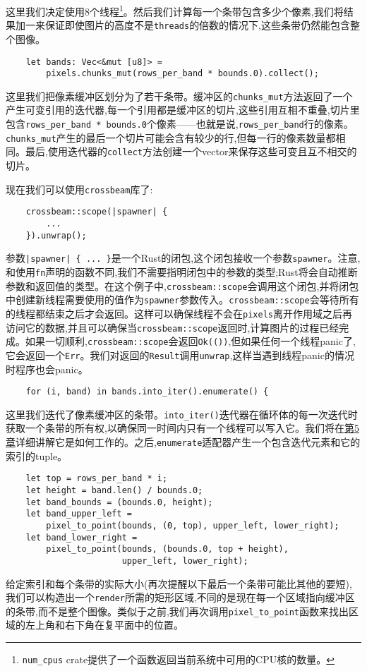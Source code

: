这里我们决定使用8个线程\footnote{\texttt{num\_cpus} crate提供了一个函数返回当前系统中可用的CPU核的数量。}。然后我们计算每一个条带包含多少个像素,我们将结果加一来保证即使图片的高度不是\texttt{threads}的倍数的情况下,这些条带仍然能包含整个图像。

\begin{verbatim}
    let bands: Vec<&mut [u8]> =
        pixels.chunks_mut(rows_per_band * bounds.0).collect();
\end{verbatim}

这里我们把像素缓冲区划分为了若干条带。缓冲区的\texttt{chunks\_mut}方法返回了一个产生可变引用的迭代器,每一个引用都是缓冲区的切片,这些引用互相不重叠,切片里包含\texttt{rows\_per\_band * bounds.0}个像素——也就是说,\texttt{rows\_per\_band}行的像素。\texttt{chunks\_mut}产生的最后一个切片可能会含有较少的行,但每一行的像素数量都相同。最后,使用迭代器的\texttt{collect}方法创建一个vector来保存这些可变且互不相交的切片。

现在我们可以使用\texttt{crossbeam}库了:
\begin{verbatim}
    crossbeam::scope(|spawner| {
        ...
    }).unwrap();
\end{verbatim}
参数\texttt{|spawner| \{ ... \}}是一个Rust的闭包,这个闭包接收一个参数\texttt{spawner}。注意,和使用\texttt{fn}声明的函数不同,我们不需要指明闭包中的参数的类型;Rust将会自动推断参数和返回值的类型。在这个例子中,\texttt{crossbeam::scope}会调用这个闭包,并将闭包中创建新线程需要使用的值作为\texttt{spawner}参数传入。\texttt{crossbeam::scope}会等待所有的线程都结束之后才会返回。这样可以确保线程不会在\texttt{pixels}离开作用域之后再访问它的数据,并且可以确保当\texttt{crossbeam::scope}返回时,计算图片的过程已经完成。如果一切顺利,\texttt{crossbeam::scope}会返回\texttt{Ok(())},但如果任何一个线程panic了,它会返回一个\texttt{Err}。我们对返回的\texttt{Result}调用\texttt{unwrap},这样当遇到线程panic的情况时程序也会panic。

\begin{verbatim}
    for (i, band) in bands.into_iter().enumerate() {
\end{verbatim}
这里我们迭代了像素缓冲区的条带。\texttt{into\_iter()}迭代器在循环体的每一次迭代时获取一个条带的所有权,以确保同一时间内只有一个线程可以写入它。我们将在\hyperref[ch05]{第5章}详细讲解它是如何工作的。之后,\texttt{enumerate}适配器产生一个包含迭代元素和它的索引的tuple。

\begin{verbatim}
    let top = rows_per_band * i;
    let height = band.len() / bounds.0;
    let band_bounds = (bounds.0, height);
    let band_upper_left = 
        pixel_to_point(bounds, (0, top), upper_left, lower_right);
    let band_lower_right = 
        pixel_to_point(bounds, (bounds.0, top + height),
                       upper_left, lower_right);
\end{verbatim}
给定索引和每个条带的实际大小(再次提醒以下最后一个条带可能比其他的要短),我们可以构造出一个\texttt{render}所需的矩形区域,不同的是现在每一个区域指向缓冲区的条带,而不是整个图像。类似于之前,我们再次调用\texttt{pixel\_to\_point}函数来找出区域的左上角和右下角在复平面中的位置。

